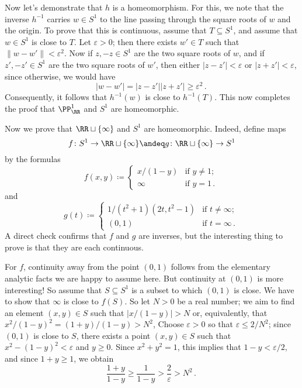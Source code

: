 \begin{exm}
	Now let's demonstrate that $h $ is a homeomorphism.
	For this, we note that the inverse $h^{-1}$ carries $w \in S^1$ to the line passing through the square roots of $w$ and the origin.
	To prove that this is continuous, assume that $T \subseteq S^1$, and assume that $w \in S^1$ is close to $T$.
	Let $\varepsilon>0$;
	then there exists $w' \in T$ such that $\|w-w'\| < \varepsilon^2$.
	Now if $z, -z \in S^1$ are the two square roots of $w$, and if $z', -z' \in S^1$ are the two square roots of $w'$, then either $|z-z'|<\varepsilon$ or $|z+z'|<\varepsilon$, since
	otherwise, we would have
	\[
		|w-w'| = |z-z'| |z+z'| \geq \varepsilon^2 \period
	\]
	Consequently, it follows that $h^{-1}(w)$ is close to $h^{-1}(T)$.
	This now completes the proof that $\PP^1_{\RR}$ and $S^1$ are homeomorphic.

	Now we prove that $\RR \sqcup \{\infty\}$ and $S^1$ are homeomorphic.
	Indeed, define maps
	\[
		f \colon S^1 \to \RR \sqcup \{\infty\} \andeq g \colon \RR \sqcup \{\infty\} \to S^1
	\]
	by the formulas
	\[
		f(x,y) \coloneq \begin{cases}
			x/(1-y) & \text{if } y \neq 1 \semicolon \\
			\infty & \text{if } y = 1 \period
		\end{cases}
	\]
	and
	\[
		g(t) \coloneq \begin{cases}
			1/(t^2+1)(2t, t^2-1) & \text{if } t \neq \infty \semicolon \\
			(0,1) & \text{if } t = \infty \period
		\end{cases}
	\]
	A direct check confirms that $f$ and $g$ are inverses, but the interesting thing to prove is that they are each continuous.
	
	For $f$, continuity away from the point $(0,1)$ follows from the elementary analytic facts we are happy to assume here.
	But continuity at $(0,1)$ is more interesting!
	So assume that $S \subseteq S^1$ is a subset to which $(0,1)$ is close.
	We have to show that $\infty$ is close to $f(S)$.
	So let $N > 0$ be a real number; 
	we aim to find an element $ (x,y) \in S $ such that $|x/(1-y)| > N$ or, equivalently, that $x^2/(1-y)^2 = (1+y)/(1-y) > N^2$,
	Choose $\varepsilon>0$ so that $\varepsilon \leq 2/N^2$;
	since $(0,1)$ is close to $S$, there exists a point $(x,y) \in S$ such that $x^2 - (1-y)^2 < \varepsilon$ and $y \geq 0$.
	Since $x^2+y^2 = 1$, this implies that $1-y < \varepsilon/2$, and since $1+y \geq 1$, we obtain
	\[
		\frac{1+y}{1-y} \geq \frac{1}{1-y} > \frac{2}{\varepsilon} > N^2 \period
	\]


\end{exm}
